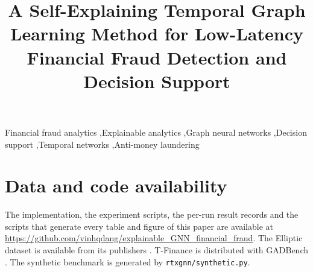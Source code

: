 \documentclass[preprint,12pt,authoryear]{elsarticle}
\begin{document}
\begin{frontmatter}

\title{A Self-Explaining Temporal Graph Learning Method for Low-Latency Financial Fraud Detection and Decision Support}





\begin{abstract}

\end{abstract}

\begin{keyword}
Financial fraud analytics \sep Explainable analytics \sep Graph neural networks \sep Decision support \sep Temporal networks \sep Anti-money laundering
\end{keyword}

\end{frontmatter}









\section*{Data and code availability}
The implementation, the experiment scripts, the per-run result records and the scripts that generate every table and figure of this paper are available at \url{https://github.com/vinhqdang/explainable_GNN_financial_fraud}. The Elliptic dataset is available from its publishers \citep{weber2019anti}. T-Finance is distributed with GADBench \citep{tang2023gadbench}. The synthetic benchmark is generated by \texttt{rtxgnn/synthetic.py}.
\end{document}
